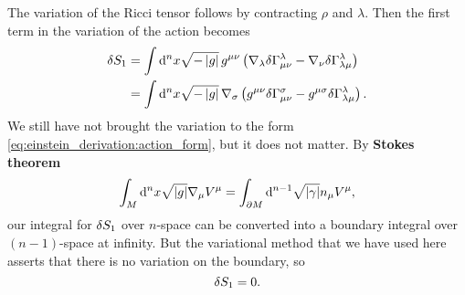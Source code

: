 The variation of the Ricci tensor follows by contracting $\rho$ and $\lambda$. 
Then the first term in the variation of the action becomes
\begin{equation}
\begin{split}
	\delta S_1 &= \int \mathop{}\!\mathrm{d}^n x \sqrt{-\left\lvert g \right\rvert} \, g^{\mu \nu} \left( \nabla_\lambda \delta \Gamma^\lambda_{\mu \nu} - \nabla_\nu \delta \Gamma^\lambda_{\lambda \mu} \right) \\
	                &= \int \mathop{}\!\mathrm{d}^n x \sqrt{-\left\lvert g \right\rvert} \, \nabla_\sigma \left( g^{\mu \nu} \delta \Gamma^\sigma_{\mu \nu} - g^{\mu \sigma} \delta \Gamma^\lambda_{\lambda \mu} \right) . \\
	\label{eq:einstein_derivation:ds1_intermediate}
\end{split}
\end{equation}
We still have not brought the variation to the form \eqref{eq:einstein_derivation:action_form}, but it does not matter.
By \textbf{Stokes theorem} \cite[equation 3.35]{ref:carroll}
\begin{equation}
	\int_M \mathop{}\!\mathrm{d}^n x \sqrt{\left\lvert g \right\rvert} \nabla_\mu V^\mu = \int_{\partial M} \mathop{}\!\mathrm{d}^{n-1} \sqrt{\left\lvert \gamma \right\rvert} n_\mu V^\mu ,
\end{equation}
our integral for $\delta S_1$ over $n$-space can be converted into a boundary integral over $(n-1)$-space at infinity.
But the variational method that we have used here asserts that there is no variation on the boundary, so
\begin{equation}
	\delta S_1 = 0 .
\end{equation}

